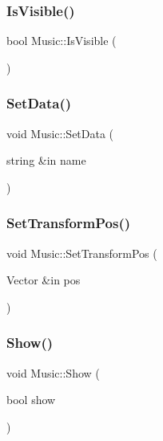 \hypertarget{class_music_af623044781215aff628e9b5b83a26706}{}\label{class_music_af623044781215aff628e9b5b83a26706} 
\subsubsection{\texorpdfstring{Is\+Visible()}{IsVisible()}}
{\footnotesize\ttfamily bool Music\+::\+Is\+Visible (\begin{DoxyParamCaption}{ }\end{DoxyParamCaption})}

\hypertarget{class_music_a298086f3bbf606b25a06545062aa30e9}{}\label{class_music_a298086f3bbf606b25a06545062aa30e9} 
\subsubsection{\texorpdfstring{Set\+Data()}{SetData()}}
{\footnotesize\ttfamily void Music\+::\+Set\+Data (\begin{DoxyParamCaption}\item[{string \&in}]{name }\end{DoxyParamCaption})}

\hypertarget{class_music_aef95bd94c4f71e1f8bbcd9ab898e908e}{}\label{class_music_aef95bd94c4f71e1f8bbcd9ab898e908e} 
\subsubsection{\texorpdfstring{Set\+Transform\+Pos()}{SetTransformPos()}}
{\footnotesize\ttfamily void Music\+::\+Set\+Transform\+Pos (\begin{DoxyParamCaption}\item[{Vector \&in}]{pos }\end{DoxyParamCaption})}

\hypertarget{class_music_a1ab196a28fc48f7fc133e1ea05a2fcc7}{}\label{class_music_a1ab196a28fc48f7fc133e1ea05a2fcc7} 
\subsubsection{\texorpdfstring{Show()}{Show()}}
{\footnotesize\ttfamily void Music\+::\+Show (\begin{DoxyParamCaption}\item[{bool}]{show }\end{DoxyParamCaption})}

